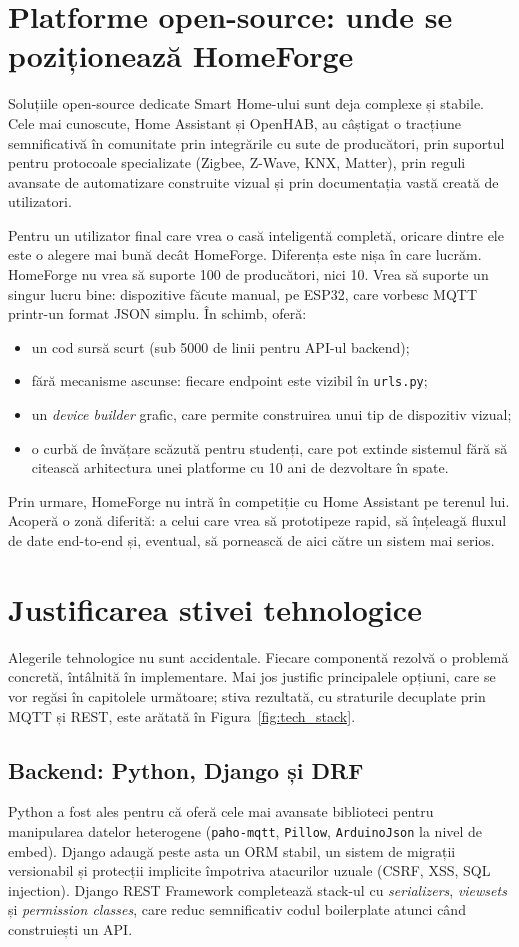 \section{Platforme open-source: unde se poziționează HomeForge}
Soluțiile open-source dedicate Smart Home-ului sunt deja complexe și stabile. Cele mai cunoscute, Home Assistant și OpenHAB, au câștigat o tracțiune semnificativă în comunitate prin integrările cu sute de producători, prin suportul pentru protocoale specializate (Zigbee, Z-Wave, KNX, Matter), prin reguli avansate de automatizare construite vizual și prin documentația vastă creată de utilizatori.

Pentru un utilizator final care vrea o casă inteligentă completă, oricare dintre ele este o alegere mai bună decât HomeForge. Diferența este nișa în care lucrăm. HomeForge nu vrea să suporte 100 de producători, nici 10. Vrea să suporte un singur lucru bine: dispozitive făcute manual, pe ESP32, care vorbesc MQTT printr-un format JSON simplu. În schimb, oferă:
\begin{itemize}
    \item un cod sursă scurt (sub 5000 de linii pentru API-ul backend);
    \item fără mecanisme ascunse: fiecare endpoint este vizibil în \texttt{urls.py};
    \item un \textit{device builder} grafic, care permite construirea unui tip de dispozitiv vizual;
    \item o curbă de învățare scăzută pentru studenți, care pot extinde sistemul fără să citească arhitectura unei platforme cu 10 ani de dezvoltare în spate.
\end{itemize}

Prin urmare, HomeForge nu intră în competiție cu Home Assistant pe terenul lui. Acoperă o zonă diferită: a celui care vrea să prototipeze rapid, să înțeleagă fluxul de date end-to-end și, eventual, să pornească de aici către un sistem mai serios.

\section{Justificarea stivei tehnologice}
Alegerile tehnologice nu sunt accidentale. Fiecare componentă rezolvă o problemă concretă, întâlnită în implementare. Mai jos justific principalele opțiuni, care se vor regăsi în capitolele următoare; stiva rezultată, cu straturile decuplate prin MQTT și REST, este arătată în Figura~\ref{fig:tech_stack}.

\subsection{Backend: Python, Django și DRF}
Python a fost ales pentru că oferă cele mai avansate biblioteci pentru manipularea datelor heterogene (\texttt{paho-mqtt}, \texttt{Pillow}, \texttt{ArduinoJson} la nivel de embed). Django adaugă peste asta un ORM stabil, un sistem de migrații versionabil și protecții implicite împotriva atacurilor uzuale (CSRF, XSS, SQL injection). Django REST Framework completează stack-ul cu \textit{serializers}, \textit{viewsets} și \textit{permission classes}, care reduc semnificativ codul boilerplate atunci când construiești un API.

